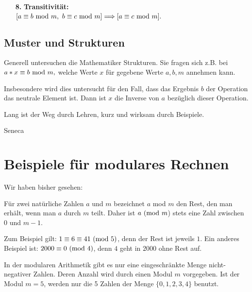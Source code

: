 \begin{refsegment}
\begin{itemize}
\item[\textbf{8.}]  \textbf{Transitivität:}\\
$ [ a \equiv b {\rm ~mod~ } m, ~b \equiv c {\rm ~mod~ } m] \Longrightarrow [ a \equiv c {\rm ~mod~ } m].
$
\end{itemize}


\hypertarget{Chapter_ElementaryNT_5_2}{}
\subsection{Muster und Strukturen} 
\label{Label_Chapter_ElementaryNT_5_2}

Generell untersuchen die Mathematiker \glqq Strukturen\grqq. Sie fragen sich
z.B. bei $ a * x \equiv b {\rm ~mod~ } m, $ welche Werte $x$ für gegebene
Werte $a,b,m$ annehmen kann.

Insbesondere wird dies untersucht für den Fall, dass das Ergebnis $b$ der
Operation das neutrale Element ist. Dann ist $x$ die Inverse von $a$
bezüglich dieser Operation.




\begin{ctsquote}
    Lang ist der Weg durch Lehren, kurz und wirksam durch Beispiele.
\caption[Seneca]{Seneca\footnotemark}
\end{ctsquote}
\addtocounter{footnote}{0}

\section{Beispiele für modulares Rechnen}

Wir haben bisher gesehen:

Für zwei natürliche Zahlen $a$ und $m$ bezeichnet  $a$ mod $m$  den Rest, den
man erhält, wenn man $a$ durch $m$ teilt. Daher ist $a {\rm ~(mod~ } m$) stets
eine Zahl zwischen $0$ und $m-1$.

Zum Beispiel gilt: $1 \equiv  6  \equiv  41 {\rm ~(mod~ } 5)$, denn der Rest
ist jeweils $1$. Ein anderes Beispiel ist: $2000  \equiv  0 {\rm ~(mod~ } 4)$,
denn $4$ geht in $2000$ ohne Rest auf.

In der modularen Arithmetik gibt es nur eine eingeschränkte Menge
nicht-negativer Zahlen. Deren Anzahl wird durch einen Modul $m$ vorgegeben.
Ist der Modul $m = 5$, werden nur die 5 Zahlen der Menge $\{ 0, 1, 2, 3, 4\}$
benutzt.


\end{refsegment}
